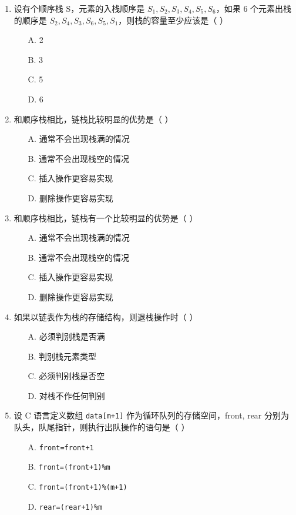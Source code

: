\documentclass[12pt, a4paper]{article}
\begin{document}
\begin{enumerate}[label=\arabic*.]
	\item 设有个顺序栈 S，元素的入栈顺序是 $S_1, S_2, S_3, S_4, S_5, S_6$，如果 6 个元素出栈的顺序是 $S_2, S_4, S_3, S_6, S_5, S_1$，则栈的容量至少应该是（ ）
	      \begin{enumerate}
		      \item[A.] 2
		      \item[B.] 3
		      \item[C.] 5
		      \item[D.] 6
	      \end{enumerate}

	\item 和顺序栈相比，链栈比较明显的优势是（ ）
	      \begin{enumerate}
		      \item[A.] 通常不会出现栈满的情况
		      \item[B.] 通常不会出现栈空的情况
		      \item[C.] 插入操作更容易实现
		      \item[D.] 删除操作更容易实现
	      \end{enumerate}

	\item 和顺序栈相比，链栈有一个比较明显的优势是（ ）
	      \begin{enumerate}
		      \item[A.] 通常不会出现栈满的情况
		      \item[B.] 通常不会出现栈空的情况
		      \item[C.] 插入操作更容易实现
		      \item[D.] 删除操作更容易实现
	      \end{enumerate}

	\item 如果以链表作为栈的存储结构，则退栈操作时（ ）
	      \begin{enumerate}
		      \item[A.] 必须判别栈是否满
		      \item[B.] 判别栈元素类型
		      \item[C.] 必须判别栈是否空
		      \item[D.] 对栈不作任何判别
	      \end{enumerate}

	\item 设 C 语言定义数组 \texttt{data[m+1]} 作为循环队列的存储空间，front, rear 分别为队头，队尾指针，则执行出队操作的语句是（ ）
	      \begin{enumerate}
		      \item[A.] \texttt{front=front+1}
		      \item[B.] \texttt{front=(front+1)\%m}
		      \item[C.] \texttt{front=(front+1)\%(m+1)}
		      \item[D.] \texttt{rear=(rear+1)\%m}
	      \end{enumerate}


\end{enumerate}
\end{document}

